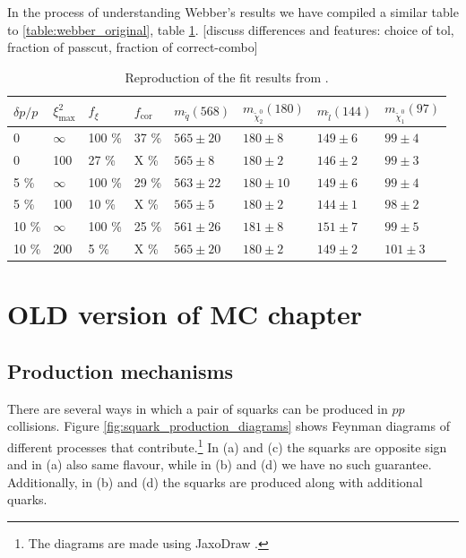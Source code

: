 \documentclass[twoside,english]{uiofysmaster}
\begin{document}
In the process of understanding Webber's results we have compiled a similar table to \ref{table:webber_original}, table \ref{table:webber_rec}. [discuss differences and features: choice of tol, fraction of passcut, fraction of correct-combo]

\begin{table}[hbt]
	\centering
	\begin{tabular}{| l | l | l | l  || l | l | l | l |}
		\hline
		$\delta p/p$ & $\xi^2_\mathrm{max}$ & $f_\xi$ & $f_\mathrm{cor}$ & $m_{\tilde q} (568)$ & $m_{\tilde \chi_2^0} (180)$ & $m_{\tilde l} (144)$ & $m_{\tilde \chi_1^0} (97)$ \\
		\hline \hline
		0 & 	$\infty$ &	100 \%	& 37 \%	& $565 \pm 20$	&	$180 \pm 8$		&	$149 \pm 6$	& 	$99 \pm 4$	\\
		0 &		100 &		27 \%	& X \% & $565 \pm 8$	&	$180 \pm 2$		&	$146 \pm 2$	&	$99 \pm 3$	\\
		5 \% &	$\infty$ &	100 \%	& 29 \% & $563 \pm 22$	& 	$180 \pm 10$	&	$149 \pm 6$&	$99 \pm 4$ \\
		5 \% &	100 &		10 \%	& X \% & $565 \pm 5$	&	$180 \pm 2$		& 	$144 \pm 1$	&	$98 \pm 2$	\\
		10 \% &	$\infty$ &	100 \%	& 25 \% & $561 \pm 26$	&	$181 \pm 8$		&	$151 \pm 7$&	$99 \pm 5$	\\
		10 \% &	200 &		5 \%	& X \% & $565 \pm 20$	& 	$180 \pm 2$		&	$149 \pm 2$&	$101 \pm 3$ \\
		\hline
	\end{tabular}
	\caption{Reproduction of the fit results from \cite{Webber:2009vm}.}
	\label{table:webber_rec}
\end{table}






















\chapter{OLD version of MC chapter}

\section{Production mechanisms}
There are several ways in which a pair of squarks can be produced in $pp$ collisions. Figure \ref{fig:squark_production_diagrams} shows Feynman diagrams of different processes that contribute.\footnote{The diagrams are made using JaxoDraw \cite{Binosi:2003yf}.} In (a) and (c) the squarks are opposite sign and in (a) also same flavour, while in (b) and (d) we have no such guarantee. Additionally, in (b) and (d) the squarks are produced along with additional quarks.
\end{document}
